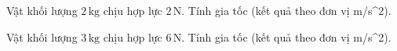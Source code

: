 \begin{bt}
Vật khối lượng $2\,\text{kg}$ chịu hợp lực $2\,\text{N}$. Tính gia tốc (kết quả theo đơn vị m/s^2).
\end{bt}

\begin{bt}
Vật khối lượng $3\,\text{kg}$ chịu hợp lực $6\,\text{N}$. Tính gia tốc (kết quả theo đơn vị m/s^2).
\end{bt}
